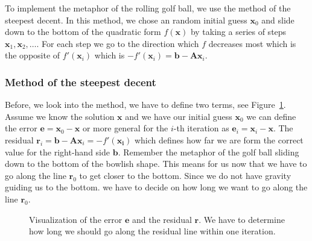 \documentclass[11pt,fleqn]{book} %
\begin{document}
To implement the metaphor of the rolling golf ball, we use the method of the steepest decent. In this method, we chose an random initial guess $\mathbf{x}_0$ and slide down to the bottom of the quadratic form $f(\mathbf{x})$ by taking a series of steps $\mathbf{x}_1,\mathbf{x}_2,\ldots$. For each step we go to the direction which $f$ decreases most which is the opposite of $f'(\mathbf{x}_i)$ which is $-f'(\mathbf{x}_i)= \mathbf{b}-\mathbf{A}\mathbf{x}_i$.

\subsubsection{Method of the steepest decent}
Before, we look into the method, we have to define two terms, see Figure~\ref{fig:skecth:error:residual}. Assume we know the solution $\mathbf{x}$ and we have our initial guess $\mathbf{x}_0$ we can define the error $\mathbf{e} = \mathbf{x}_0 - \mathbf{x}$ or more general for the $i$-th iteration as  $\mathbf{e}_i = \mathbf{x}_i - \mathbf{x}$. The residual $\mathbf{r}_i = \mathbf{b}-\mathbf{A}\mathbf{x}_i=-f'(\mathbf{x_i})$ which defines how far we are form the correct value for the right-hand side $\mathbf{b}$. Remember the metaphor of the golf ball sliding down to the bottom of the bowlish shape. This means for us now that we have to go along the line $\mathbf{r}_0$ to get closer to the bottom. Since we do not have gravity guiding us to the bottom. we have to decide on how long we want to go along the line $\mathbf{r}_0$.\\

\begin{figure}[tb]
\centering
{}
\caption{Visualization of the error $\mathbf{e}$ and the residual $\mathbf{r}$. We have to determine how long we should go along the residual line within one iteration. }
\label{fig:skecth:error:residual}
\end{figure}
\end{document}
